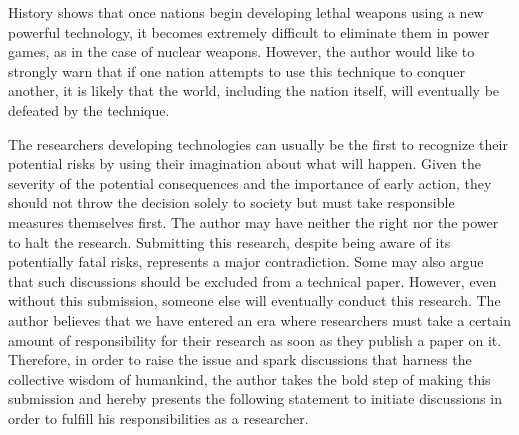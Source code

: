 History shows that 
once nations begin developing lethal weapons using a new powerful technology,
it becomes extremely difficult to eliminate them in power games, as in the case of nuclear weapons.
However, the author would like to strongly warn that
if one nation attempts to use this technique to conquer another, 
it is likely that the world, including the nation itself, will eventually be defeated by the technique.

The researchers developing technologies can usually be the first to recognize their potential risks
by using their imagination about what will happen.
Given the severity of the potential consequences and the importance of early action,
they should not throw the decision solely to society but must take responsible measures themselves first.
The author may have neither the right nor the power to halt the research.
Submitting this research, despite being aware of its potentially fatal risks, represents a major contradiction.
Some may also argue that such discussions should be excluded from a technical paper.
However, even without this submission, someone else will eventually conduct this research.
The author believes that we have entered an era
where researchers must take a certain amount of responsibility for their research as soon as they publish a paper on it.
Therefore, in order to raise the issue and spark discussions that harness the collective wisdom of humankind,
the author takes the bold step of making this submission and hereby presents the following statement
to initiate discussions in order to fulfill his responsibilities as a researcher.


